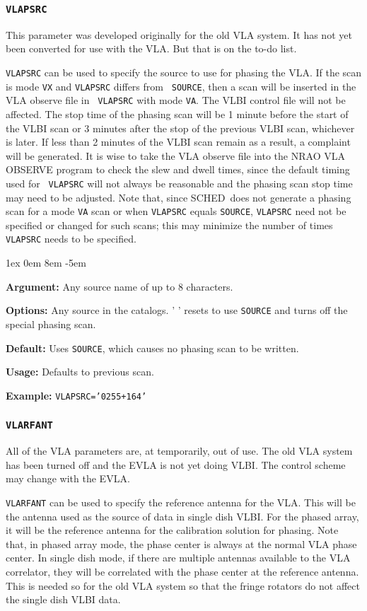 \documentclass{report}
\newcommand{\schedb}{{\sc SCHED~}}
\newcommand{\rcwbox}[5]{
  \begin{list}{}{\parsep 1ex  \itemsep 0em
                 \leftmargin 8em  \itemindent -5em }
    \item {\bf Argument:} #1
    \item {\bf Options:}  #2
    \item {\bf Default:}  #3
    \item {\bf Usage:}    #4
    \item {\bf Example:}  #5
  \end{list}
}
\begin{document}
\subsubsection{\label{MP:VLAPSRC}{\tt VLAPSRC}}

This parameter was developed originally for the old VLA system.  It has
not yet been converted for use with the VLA.  But that is on the to-do 
list.

{\tt VLAPSRC} can be used to specify the source to use for phasing the
VLA. If the scan is mode {\tt VX} and {\tt VLAPSRC} differs from {\tt
SOURCE}, then a scan will be inserted in the VLA observe file in {\tt
VLAPSRC} with mode {\tt VA}. The VLBI control file will not be
affected. The stop time of the phasing scan will be 1 minute before
the start of the VLBI scan or 3 minutes after the stop of the previous
VLBI scan, whichever is later. If less than 2 minutes of the VLBI scan
remain as a result, a complaint will be generated. It is wise to take
the VLA observe file into the NRAO {\sc VLA OBSERVE} program to check
the slew and dwell times, since the default timing used for {\tt
VLAPSRC} will not always be reasonable and the phasing scan stop time
may need to be adjusted. Note that, since \schedb does not
generate a phasing scan for a mode {\tt VA} scan or when {\tt VLAPSRC}
equals {\tt SOURCE}, {\tt VLAPSRC} need not be specified or changed
for such scans; this may minimize the number of times {\tt VLAPSRC}
needs to be specified.

\rcwbox
{Any source name of up to 8 characters.}
{Any source in the catalogs. ' ' resets to use {\tt SOURCE} and
turns off the special phasing scan.}
{Uses {\tt SOURCE}, which causes no phasing scan to be written.}
{Defaults to previous scan.}
{{\tt VLAPSRC='0255+164'}}


\subsubsection{\label{MP:VLARFANT}{\tt VLARFANT}}

All of the VLA parameters are, at temporarily, out of use.  The old
VLA system has been turned off and the EVLA is not yet doing VLBI.
The control scheme may change with the EVLA.

{\tt VLARFANT} can be used to specify the reference antenna for the
VLA.  This will be the antenna used as the source of data in single
dish VLBI.  For the phased array, it will be the reference antenna
for the calibration solution for phasing.  Note that, in phased array
mode, the phase center is always at the normal VLA phase center.  In
single dish mode, if there are multiple antennas available to the
VLA correlator, they will be correlated with the phase center at the
reference antenna.  This is needed so for the old VLA system so that
the fringe rotators do not affect the single dish VLBI data.
\end{document}
